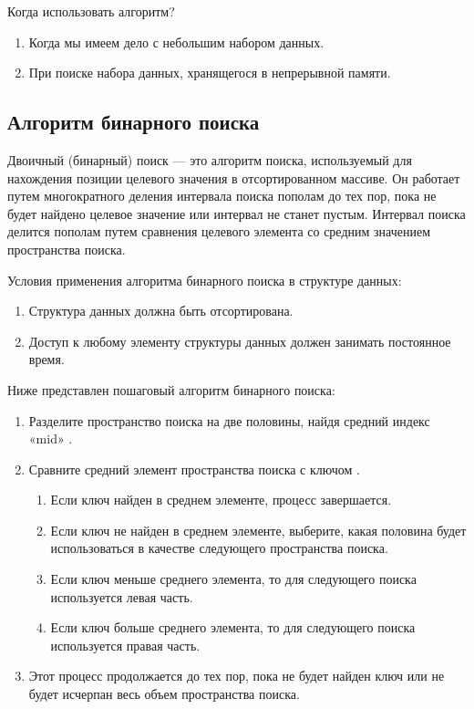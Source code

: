 Когда использовать алгоритм?
\begin{enumerate}
\item Когда мы имеем дело с небольшим набором данных.
\item При поиске набора данных, хранящегося в непрерывной памяти.
\end{enumerate}

\subsection{Алгоритм бинарного поиска}

\hspace{1.25cm}
Двоичный (бинарный) поиск — это алгоритм поиска, используемый для нахождения позиции целевого значения в отсортированном массиве. Он работает путем многократного деления интервала поиска пополам до тех пор, пока не будет найдено целевое значение или интервал не станет пустым. Интервал поиска делится пополам путем сравнения целевого элемента со средним значением пространства поиска.

\vspace{0.25cm}
Условия применения алгоритма бинарного поиска в структуре данных:
\begin{enumerate}
\item Структура данных должна быть отсортирована.
\item Доступ к любому элементу структуры данных должен занимать постоянное время.
\end{enumerate}

Ниже представлен пошаговый алгоритм бинарного поиска:

\begin{enumerate}
\item Разделите пространство поиска на две половины, найдя средний индекс «mid» . 
\item Сравните средний элемент пространства поиска с ключом .
\begin{enumerate}
\item Если ключ найден в среднем элементе, процесс завершается.
\item Если ключ не найден в среднем элементе, выберите, какая половина будет использоваться в качестве следующего пространства поиска.
\item Если ключ меньше среднего элемента, то для следующего поиска используется левая часть.
\item Если ключ больше среднего элемента, то для следующего поиска используется правая часть.
\end{enumerate}
\item Этот процесс продолжается до тех пор, пока не будет найден ключ или не будет исчерпан весь объем пространства поиска.
\end{enumerate}

